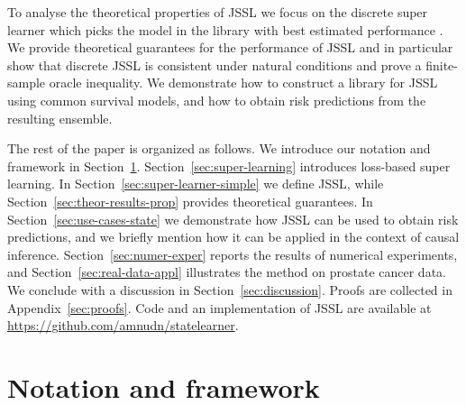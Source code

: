 \documentclass[a4paper,danish]{article}
\theoremstyle{plain} %
\numberwithin{theorem}{section}
\theoremstyle{definition} %
\theoremstyle{remark}
\newcommand{\1}{\mathds{1}}
\begin{document}
To analyse the theoretical properties of JSSL we
focus on the discrete super learner which picks the model in
the library with best estimated performance
\citep{van2007super}. We provide theoretical guarantees
for the performance of JSSL and in particular
show that discrete JSSL is consistent under
natural conditions and prove a finite-sample oracle
inequality. We demonstrate how to construct a library for JSSL using common survival models, and how to obtain
risk predictions from the resulting ensemble.

The rest of the paper is organized as follows.
We introduce our notation and framework in
Section~\ref{sec:framework}. Section~\ref{sec:super-learning}
introduces loss-based super learning. In
Section~\ref{sec:super-learner-simple} we define JSSL,
while Section~\ref{sec:theor-results-prop} provides theoretical
guarantees. In Section~\ref{sec:use-cases-state} we demonstrate how
JSSL can be used to obtain risk predictions, and we
briefly mention how it can be applied in the context of causal
inference.  Section~\ref{sec:numer-exper} reports the results of
numerical experiments, and Section~\ref{sec:real-data-appl}
illustrates the method on prostate cancer data. We conclude with a
discussion in Section~\ref{sec:discussion}. Proofs are collected in
Appendix~\ref{sec:proofs}. Code and an implementation of JSSL are available at \url{https://github.com/amnudn/statelearner}.

\section{Notation and framework}
\label{sec:framework}
\end{document}
